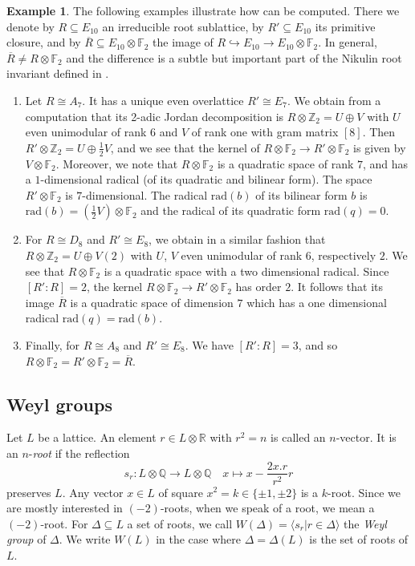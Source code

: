 \documentclass[a4paper]{amsart}
\theoremstyle{definition}
\newtheorem{example}[definition]{Example}
\theoremstyle{plain}
\newcommand{\QQ}{\mathbb{Q}}
\newcommand{\FF}{\mathbb{F}}
\newcommand{\RR}{\mathbb{R}}
\newcommand{\ZZ}{\mathbb{Z}}
\begin{document}
\begin{example}\label{example:root_invariant}
The following examples illustrate how  can be computed. There we denote by $R\subseteq E_{10}$ an irreducible root sublattice, by $R'\subseteq E_{10}$ its primitive closure, and by $\overline{R}\subseteq E_{10}\otimes\FF_2$ the image of $R\hookrightarrow E_{10}\to E_{10}\otimes\FF_2$.
In general, $\overline{R}\neq R\otimes \FF_2$ and the difference is a subtle but important part of the Nikulin root invariant defined in . 
\begin{enumerate}
\item Let $R\cong A_7$. It has a unique even overlattice $R' \cong E_7$. We obtain from a computation that its 2-adic Jordan decomposition is 
$R \otimes \ZZ_2 = U \oplus V$ with $U$ even unimodular of rank $6$ and $V$ of rank one with gram matrix $[8]$. Then $R' \otimes \ZZ_2 = U \oplus \frac{1}{2}V$, and we see that 
the kernel of $R \otimes \FF_2 \to R'\otimes \FF_2$ is given by $V \otimes \FF_2$. Moreover, we note that $R \otimes \FF_2$ is a quadratic space of rank $7$, and has a $1$-dimensional radical (of its quadratic and bilinear form). The space $R'\otimes \FF_2$ is $7$-dimensional. The radical $\mathrm{rad}(b)$ of its bilinear form $b$ is $\mathrm{rad}(b)=\left(\frac{1}{2}V \right)\otimes \FF_2$ and 
the radical of its quadratic form $\mathrm{rad}(q)=0$. 
\item For $R\cong D_8$ and $R'\cong E_8$, we obtain in a similar fashion that $R \otimes \ZZ_2 = U \oplus V(2)$ with $U$, $V$ even unimodular of rank $6$, respectively $2$. 
We see that $R \otimes \FF_2$ is a quadratic space with a two dimensional radical.
Since $[R':R]=2$, the kernel $R \otimes \FF_2 \to R'\otimes \FF_2$ has order $2$. It follows that its image $\overline{R}$ is a quadratic space of dimension $7$ which has a one dimensional radical $\mathrm{rad}(q)=\mathrm{rad}(b)$. 
\item Finally, for $R\cong A_8$ and $R'\cong E_8$. We have $[R':R]=3$, and so $R\otimes \FF_2=R'\otimes \FF_2=\overline{R}$.
\end{enumerate}
\end{example}

\subsection*{Weyl groups}
Let $L$ be a lattice. An element $r \in L\otimes \RR$ with $r^2=n$ is called an $n$-vector. It is an $n$-\emph{root} if the reflection
\[s_r\colon L \otimes \QQ \to L \otimes \QQ \quad x \mapsto x-\frac{2x.r}{r^2}r\]
preserves $L$. 
Any vector $x \in L$ of square $x^2=k \in\{\pm 1, \pm 2\}$ is a $k$-root. Since we are mostly interested in $(-2)$-roots, 
when we speak of a root, we mean a $(-2)$-root.
For $\Delta \subseteq L$ a set of roots, we call $W(\Delta)=\langle s_r | r \in \Delta \rangle$ the \emph{Weyl group} of $\Delta$.  We write $W(L)$ in the case where $\Delta=\Delta(L)$ is the set of roots of $L$.
\end{document}
